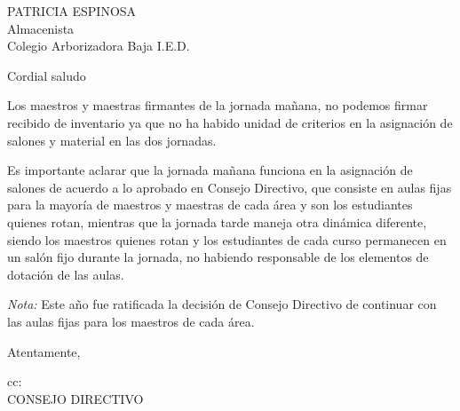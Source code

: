\documentclass[letterpaper,spanish]{letter}
\date{6 de noviembre de 2015}
\begin{document}
\begin{letter}{PATRICIA ESPINOSA\\Almacenista\\Colegio Arborizadora Baja I.E.D.}
	
\opening{Cordial saludo}
Los maestros y maestras firmantes de la jornada mañana, no podemos firmar recibido de inventario ya que no ha habido unidad de criterios en la asignación de salones y material en las dos jornadas.

Es importante aclarar que la jornada mañana funciona en la asignación de salones de acuerdo a lo aprobado en Consejo Directivo, que consiste en aulas fijas para la mayoría de maestros y maestras de cada área y son los estudiantes quienes rotan, mientras que la jornada tarde maneja otra dinámica diferente, siendo los maestros quienes rotan y los estudiantes de cada curso permanecen en un salón fijo durante la jornada, no habiendo responsable de los elementos de dotación de las aulas.

\emph{Nota:} Este año fue ratificada la decisión de Consejo Directivo de continuar con las aulas fijas para los maestros de cada área.
\closing{Atentamente,}

cc{:\\CONSEJO DIRECTIVO}

\end{letter}
\end{document}

